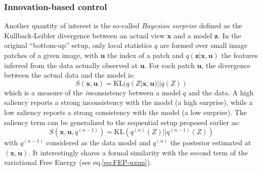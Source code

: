\documentclass[12pt,twoside,openright]{article}
\begin{document}
\subsubsection{Innovation-based control}\label{sec:saliency}





Another quantity of interest is the so-called \emph{Bayesian surprise} \cite{itti2005bayesian} defined as the Kullback-Leibler divergence between an actual view $\boldsymbol{x}$ and a model $\boldsymbol{z}$. In the original ``bottom-up'' setup, only local statistics $q$ are formed over small image patches of a given image, with $\boldsymbol{u}$ the index of a patch and $q(\boldsymbol{z}|\boldsymbol{x},\boldsymbol{u})$ the features inferred from the data actually observed at $\boldsymbol{u}$. For each patch $\boldsymbol{u}$, the divergence between the actual data and the model is:
$$ S(\boldsymbol{x},\boldsymbol{u}) = \text{KL}(q(Z| \boldsymbol{x}, \boldsymbol{u})||q(Z))$$
which is a measure of the \emph{in}consistency between a model $q$ and the data. A high saliency reports a strong inconsistency with the model (a high surprise), while a low saliency reports a strong consistency with the model (a low surprise).
The saliency term can be generalized to the sequential setup proposed earlier as:
$$ S(\boldsymbol{x},\boldsymbol{u}, q^{(n-1)}) = \text{KL}(q^{(n)}(Z)||q^{(n-1)}(Z))$$
with $q^{(n-1)}$ considered as the data model and $q^{(n)}$ the posterior estimated at $(\boldsymbol{x},\boldsymbol{u})$.
It interestingly shares a formal similarity with the second term of the variational Free Energy (see eq.\ref{eq:FEP-uxun}). 
\end{document}
